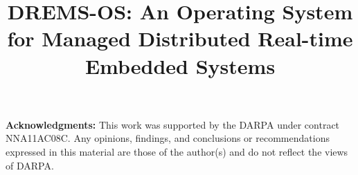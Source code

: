 \documentclass[10pt,journal]{IEEEtran}
\begin{document}
\title{ DREMS-OS: An Operating System for Managed Distributed Real-time Embedded Systems }
\vspace{-0.1in}
\author{ 
}


\maketitle










%





\textbf{Acknowledgments:} This work was supported by the DARPA 
under contract NNA11AC08C. Any opinions, findings, and
conclusions or recommendations expressed in this material
are those of the author(s) and do not  reflect
the views of DARPA.
\balance



\end{document}
